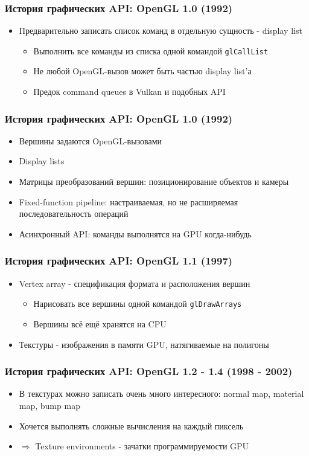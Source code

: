 \documentclass{beamer}
\begin{document}
\begin{frame}[fragile]
\frametitle{История графических API: OpenGL 1.0 (1992)}
\begin{itemize}
\item Предварительно записать список команд в отдельную сущность - display list
\begin{itemize}
\item Выполнить все команды из списка одной командой \verb|glCallList|
\item Не любой OpenGL-вызов может быть частью display list'а
\item Предок command queues в Vulkan и подобных API
\end{itemize}
\end{itemize}
\end{frame}

\begin{frame}
\frametitle{История графических API: OpenGL 1.0 (1992)}
\begin{itemize}
\item Вершины задаются OpenGL-вызовами
\item Display lists
\item Матрицы преобразований вершин: позиционирование объектов и камеры
\item Fixed-function pipeline: настраиваемая, но не расширяемая последовательность операций
\item Асинхронный API: команды выполнятся на GPU когда-нибудь
\end{itemize}
\end{frame}

\begin{frame}[fragile]
\frametitle{История графических API: OpenGL 1.1 (1997)}
\begin{itemize}
\item Vertex array - спецификация формата и расположения вершин
\begin{itemize}
\item Нарисовать все вершины одной командой \verb|glDrawArrays|
\item Вершины всё ещё хранятся на CPU
\end{itemize}
\pause
\item Текстуры - изображения в памяти GPU, натягиваемые на полигоны
\end{itemize}
\end{frame}

\begin{frame}
\frametitle{История графических API: OpenGL 1.2 - 1.4 (1998 - 2002)}
\begin{itemize}
\item В текстурах можно записать очень много интересного: normal map, material map, bump map
\item Хочется выполнять сложные вычисления на каждый пиксель
\item $\Longrightarrow$ Texture environments - зачатки программируемости GPU
\end{itemize}
\end{frame}
\end{document}
